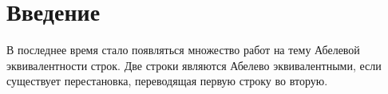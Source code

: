 \newpage
\section{Введение}

В последнее время стало появляться множество работ на тему Абелевой эквивалентности строк. Две строки являются Абелево эквивалентными, если существует перестановка, переводящая первую строку во вторую.


